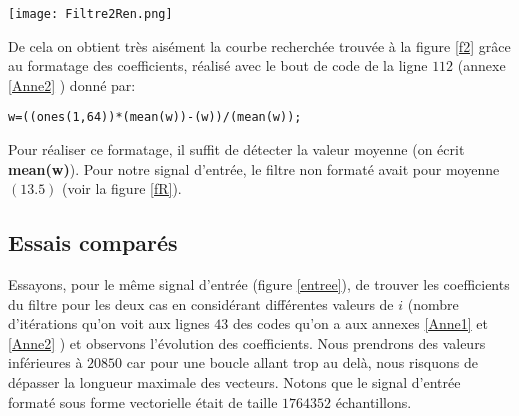 \begin{center}
\texttt{[image: Filtre2Ren.png]}
\label{fR}
\end{center}
De cela on obtient très aisément la courbe recherchée trouvée à la figure \ref{f2} grâce au formatage des coefficients, réalisé avec le bout de code de la ligne $ 112 $ (annexe \ref{Anne2} ) donné par:
\begin{verbatim}
w=((ones(1,64))*(mean(w))-(w))/(mean(w));
\end{verbatim}
Pour réaliser ce formatage, il suffit de détecter la valeur moyenne (on écrit \textbf{mean(w)}). Pour notre signal d'entrée, le filtre non formaté avait pour moyenne $ (13.5) $ (voir la figure \ref{fR}).
\subsection{Essais comparés}\label{essais}
Essayons, pour le même signal d'entrée (figure \ref{entree}), de trouver les coefficients du filtre pour les deux cas en considérant différentes valeurs de $ i $ (nombre d'itérations qu'on voit aux lignes $ 43 $ des codes qu'on a aux annexes \ref{Anne1} et \ref{Anne2} ) et observons l'évolution des coefficients. Nous prendrons des valeurs inférieures à $ 20850 $ car pour une boucle allant trop au delà, nous risquons de dépasser la longueur maximale des vecteurs. Notons que le signal d'entrée formaté sous forme vectorielle était de taille $ 1764352 $ échantillons.

